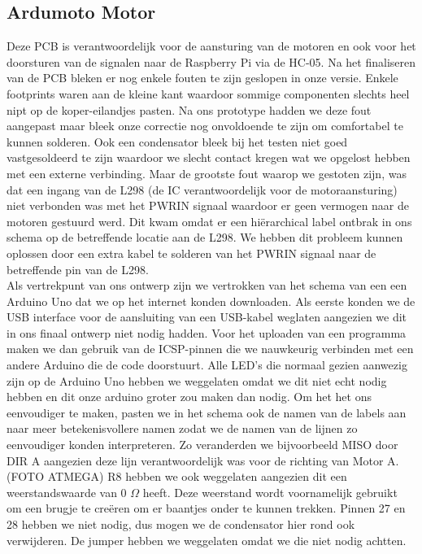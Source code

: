 \subsection{Ardumoto Motor}
Deze PCB is verantwoordelijk voor de aansturing van de motoren en ook voor het doorsturen van de signalen naar de Raspberry Pi via de HC-05. Na het finaliseren van de PCB bleken er nog enkele fouten te zijn geslopen in onze versie. Enkele footprints waren aan de kleine kant waardoor sommige componenten slechts heel nipt op de koper-eilandjes pasten. Na ons prototype hadden we deze fout aangepast maar bleek onze correctie nog onvoldoende te zijn om comfortabel te kunnen solderen. Ook een condensator bleek bij het testen niet goed vastgesoldeerd te zijn waardoor we slecht contact kregen wat we opgelost hebben met een externe verbinding. Maar de grootste fout waarop we gestoten zijn, was dat een ingang van de L298 (de IC verantwoordelijk voor de motoraansturing) niet verbonden was met het PWRIN signaal waardoor er geen vermogen naar de motoren gestuurd werd. Dit kwam omdat er een hi\"erarchical label ontbrak in ons schema op de betreffende locatie aan de L298. We hebben dit probleem kunnen oplossen door een extra kabel te solderen van het PWRIN signaal naar de betreffende pin van de L298. \\
Als vertrekpunt van ons ontwerp zijn we vertrokken van het schema van een een Arduino Uno dat we op het internet konden downloaden. Als eerste konden we de USB interface voor de aansluiting van een USB-kabel weglaten aangezien we dit in ons finaal ontwerp niet nodig hadden. Voor het uploaden van een programma maken we dan gebruik van de ICSP-pinnen die we nauwkeurig verbinden met een andere Arduino die de code doorstuurt.  Alle LED's die normaal gezien aanwezig zijn op de Arduino Uno hebben we  weggelaten omdat we dit niet echt nodig hebben en dit onze arduino groter zou maken dan nodig. Om het het ons eenvoudiger te maken, pasten we in het schema ook de namen van de labels aan naar meer betekenisvollere namen zodat we de namen van de lijnen zo eenvoudiger konden interpreteren. Zo veranderden we bijvoorbeeld MISO door DIR A aangezien deze lijn verantwoordelijk was voor de richting van Motor A. (FOTO ATMEGA) R8 hebben we ook weggelaten aangezien dit een weerstandswaarde van 0 $\Omega$ heeft. Deze weerstand wordt voornamelijk gebruikt om een brugje te cre\"eren om er baantjes onder te kunnen trekken. Pinnen 27 en 28 hebben we niet nodig, dus mogen we de condensator hier rond ook verwijderen. De jumper hebben we weggelaten omdat we die niet nodig achtten. 

